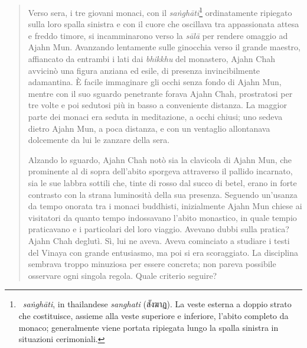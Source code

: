 \begin{quote}
Verso sera, i tre giovani monaci, con il \emph{saṅghāti}\footnote{~\emph{saṅghāti},
  in thailandese \emph{sanghati} (สังฆาฏ). La veste esterna a doppio
  strato che costituisce, assieme alla veste superiore e inferiore,
  l'abito completo da monaco; generalmente viene portata ripiegata lungo
  la spalla sinistra in situazioni cerimoniali.} ordinatamente ripiegato
sulla loro spalla sinistra e con il cuore che oscillava tra appassionata
attesa e freddo timore, si incamminarono verso la \emph{sālā} per
rendere omaggio ad Ajahn Mun. Avanzando lentamente sulle ginocchia verso
il grande maestro, affiancato da entrambi i lati dai \emph{bhikkhu} del
monastero, Ajahn Chah avvicinò una figura anziana ed esile, di presenza
invincibilmente adamantina. È facile immaginare gli occhi senza fondo di
Ajahn Mun, mentre con il suo sguardo penetrante forava Ajahn Chah,
prostratosi per tre volte e poi sedutosi più in basso a conveniente
distanza. La maggior parte dei monaci era seduta in meditazione, a occhi
chiusi; uno sedeva dietro Ajahn Mun, a poca distanza, e con un ventaglio
allontanava dolcemente da lui le zanzare della sera.

Alzando lo sguardo, Ajahn Chah notò sia la clavicola di Ajahn Mun, che
prominente al di sopra dell'abito sporgeva attraverso il pallido
incarnato, sia le sue labbra sottili che, tinte di rosso dal succo di
betel, erano in forte contrasto con la strana luminosità della sua
presenza. Seguendo un'usanza da tempo onorata tra i monaci buddhisti,
inizialmente Ajahn Mun chiese ai visitatori da quanto tempo indossavano
l'abito monastico, in quale tempio praticavano e i particolari del loro
viaggio. Avevano dubbi sulla pratica? Ajahn Chah deglutì. Sì, lui ne
aveva. Aveva cominciato a studiare i testi del Vinaya con grande
entusiasmo, ma poi si era scoraggiato. La disciplina sembrava troppo
minuziosa per essere concreta; non pareva possibile osservare ogni
singola regola. Quale criterio seguire?


\end{quote}
